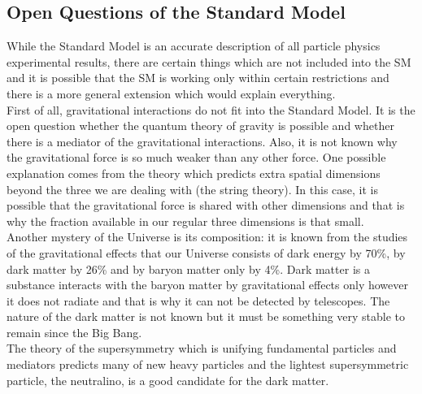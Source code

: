 \subsection{Open Questions of the Standard Model}


While the Standard Model is an accurate description of all particle physics experimental results, there are certain things which are not included into the SM and it is possible that the SM is working only within certain restrictions and there is a more general extension which would explain everything.\\

First of all, gravitational interactions do not fit into the Standard Model. It is the open question whether the quantum theory of gravity is possible and whether there is a mediator of the gravitational interactions. Also, it is not known why the gravitational force is so much weaker than any other force. One possible explanation comes from the theory which predicts extra spatial dimensions beyond the three we are dealing with (the string theory). In this case, it is possible that the gravitational force is shared with other dimensions and that is why the fraction available in our regular three dimensions is that small.\\

Another mystery of the Universe is its composition: it is known from the studies of the gravitational effects that our Universe consists of dark energy by 70\%, by dark matter by 26\% and by baryon matter only by 4\%. Dark matter is a substance interacts with the baryon matter by gravitational effects only however it does not radiate and that is why it can not be detected by telescopes. The nature of the dark matter is not known but it must be something very stable to remain since the Big Bang. \\
The theory of the supersymmetry which is unifying fundamental particles and mediators predicts many of new heavy particles and the lightest supersymmetric particle, the neutralino, is a good candidate for the dark matter.\\

